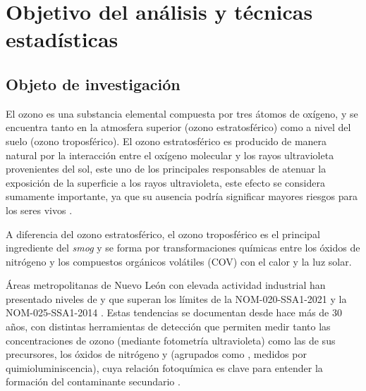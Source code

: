 %

\section{Objetivo del análisis y técnicas estadísticas}
\label{sec:objetivo-tecnicas}

\subsection{Objeto de investigación}
\label{sec:objetivo}

El ozono  es una substancia elemental compuesta por tres átomos de oxígeno, y se encuentra tanto en la atmosfera superior (ozono estratosférico) como a nivel del suelo (ozono troposférico). El ozono estratosférico es producido de manera natural por la interacción entre el oxígeno molecular  y los rayos ultravioleta provenientes del sol, este uno de los principales responsables de atenuar la exposición de la superficie a los rayos ultravioleta, este efecto se considera sumamente importante, ya que su ausencia podría significar mayores riesgos para los seres vivos \parencite{Bernhard2023-lk}.

A diferencia del ozono estratosférico, el ozono troposférico es el principal ingrediente del \textit{smog} y se forma por transformaciones químicas entre los óxidos de nitrógeno  y los compuestos orgánicos volátiles (COV) con el calor y la luz solar.

Áreas metropolitanas de Nuevo León con elevada actividad industrial han
presentado niveles de  y  que superan los límites de la
NOM-020-SSA1-2021 \parencite{nom020ssa1} y la NOM-025-SSA1-2014
\parencite{nom025ssa1}. Estas tendencias se documentan desde hace más de
30 años, con distintas herramientas
de detección que permiten medir tanto las concentraciones de ozono (mediante
fotometría ultravioleta) como las de sus precursores, los óxidos de nitrógeno
 y  (agrupados como , medidos por quimioluminiscencia),
cuya relación fotoquímica es clave para entender la formación del contaminante
secundario  \parencite{SanfordSillman}.

